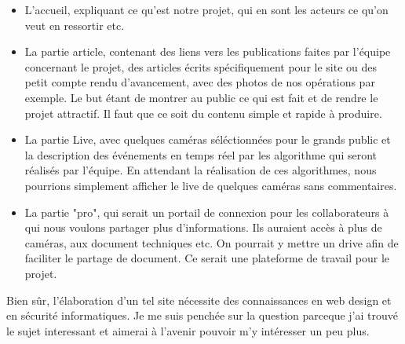 \documentclass[11pt,french,a4paper]{report}
\begin{document}
\begin{itemize}
    \item  L'accueil, expliquant ce qu'est notre projet, qui en sont les acteurs
ce qu'on veut en ressortir etc. 
    \item La partie article, contenant des liens vers les publications faites par l'équipe concernant le projet, des articles écrits
spécifiquement pour le site ou des petit compte rendu d'avancement, avec des photos de nos opérations par exemple. Le but 
étant de montrer au public ce qui est fait et de rendre le projet attractif. Il faut que ce soit du contenu simple et rapide
à produire. 
    \item  La partie Live, avec quelques caméras séléctionnées pour le grands public et la description des événements en temps réel par 
les algorithme qui seront réalisés par l'équipe. En attendant la réalisation de ces algorithmes, nous pourrions simplement afficher
le live de quelques caméras sans commentaires. \\
    \item La partie "pro", qui serait un portail de connexion pour les collaborateurs à qui nous voulons partager plus d'informations.
Ils auraient accès à plus de caméras, aux document techniques etc. On pourrait y mettre un drive afin de faciliter le partage de 
document. Ce serait une plateforme de travail pour le projet.\\
\end{itemize}
Bien sûr, l'élaboration d'un tel site nécessite des connaissances en web design et en sécurité informatiques. Je me suis penchée
sur la question parceque j'ai trouvé le sujet interessant et aimerai à l'avenir pouvoir m'y intéresser un peu plus. \\ 
\end{document}
